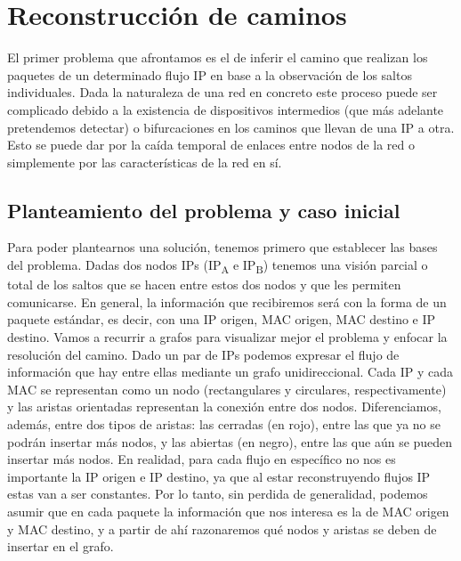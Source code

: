 \documentclass[twoside, 12pt]{epstfg}
\begin{document}
\section{Reconstrucción de caminos}
El primer problema que afrontamos es el de inferir el camino que realizan los paquetes de un determinado flujo IP en base a la observación de los saltos individuales. Dada la naturaleza de una red en concreto este proceso puede ser complicado debido a la existencia de dispositivos intermedios (que más adelante pretendemos detectar) o bifurcaciones en los caminos que llevan de una IP a otra. Esto se puede dar por la caída temporal de enlaces entre nodos de la red o simplemente por las características de la red en sí.

\subsection{Planteamiento del problema y caso inicial}

Para poder plantearnos una solución, tenemos primero que establecer las bases del problema. Dadas dos nodos IPs (IP\textsubscript{A} e IP\textsubscript{B}) tenemos una visión parcial o total de los saltos que se hacen entre estos dos nodos y que les permiten comunicarse. En general, la información que recibiremos será con la forma de un paquete estándar, es decir, con una IP origen, MAC origen, MAC destino e IP destino. Vamos a recurrir a grafos para visualizar mejor el problema y enfocar la resolución del camino. Dado un par de IPs podemos expresar el flujo de información que hay entre ellas mediante un grafo unidireccional. Cada IP y cada MAC se representan como un nodo (rectangulares y circulares, respectivamente) y las aristas orientadas representan la conexión entre dos nodos. Diferenciamos, además, entre dos tipos de aristas: las cerradas (en rojo), entre las que ya no se podrán insertar más nodos, y las abiertas (en negro), entre las que aún se pueden insertar más nodos. En realidad, para cada flujo en específico no nos es importante la IP origen e IP destino, ya que al estar reconstruyendo flujos IP estas van a ser constantes. Por lo tanto, sin perdida de generalidad, podemos asumir que en cada paquete la información que nos interesa es la de MAC origen y MAC destino, y a partir de ahí razonaremos qué nodos y aristas se deben de insertar en el grafo. 
\end{document}

